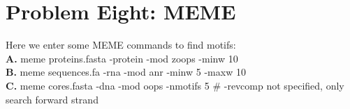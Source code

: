 \documentclass[10pt]{article} %
\begin{document}
\section{Problem Eight: MEME}
Here we enter some MEME commands to find motifs:\\
\textbf{A.} meme proteins.fasta -protein -mod zoops -minw 10\\
\textbf{B.} meme sequences.fa -rna -mod anr -minw 5 -maxw 10\\
\textbf{C.} meme cores.fasta -dna -mod oops -nmotifs 5 \# -revcomp not specified,
only search forward strand\\
\end{document}
